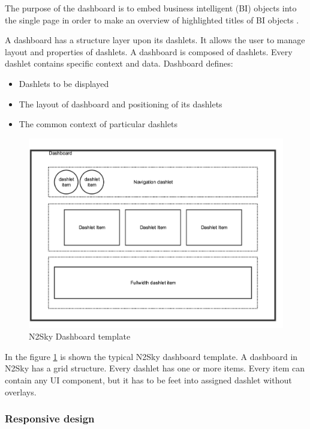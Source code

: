 The purpose of the dashboard is to embed business intelligent (BI) objects into the single page in order to make an overview of highlighted titles of BI objects \cite{dashboards_book}.

A dashboard has a structure layer upon its dashlets. It allows the user to manage layout and properties of dashlets. A dashboard is composed of dashlets. Every dashlet contains specific context and data. Dashboard defines: 
\begin{itemize}
\item Dashlets to be displayed
\item The layout of dashboard and positioning of its dashlets
\item The common context of particular dashlets
\end{itemize}


\begin{figure}[H]
\begin{center}
  \includegraphics[width=\linewidth]{components/3/components/dashboard_template.png}
  \caption{N2Sky Dashboard template}
  \label{fig:dashboard_template}
\end{center}
\end{figure}

In the figure \ref{fig:dashboard_template} is shown the typical N2Sky dashboard template. A dashboard in N2Sky has a grid structure. Every dashlet has one or more items. Every item can contain any UI component, but it has to be feet into assigned dashlet without overlays. 



\subsubsection{Responsive design}\label{Responsive design}

